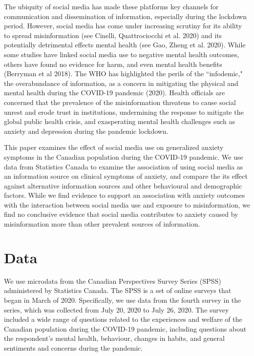 \documentclass{article}[12pt]
\begin{document}
        The ubiquity of social media has made these platforms key channels for communication and dissemination of information, especially during the lockdown period. However, social media has come under increasing scrutiny for its ability to spread misinformation (see Cinelli, Quattrociocchi et al. 2020) and its potentially detrimental effects mental health (see Gao, Zheng et al. 2020). While some studies have linked social media use to negative mental health outcomes, others have found no evidence for harm, and even mental health benefits (Berryman et al 2018). The WHO has highlighted the perils of the ``infodemic," the overabundance of information, as a concern in mitigating the physical and mental health during the COVID-19 pandemic (2020). Health officials are concerned that the prevalence of the misinformation threatens to cause social unrest and erode trust in institutions, undermining the response to mitigate the global public health crisis, and exasperating mental health challenges such as anxiety and depression during the pandemic lockdown.
        
        This paper examines the effect of social media use on generalized anxiety symptoms in the Canadian population during the COVID-19 pandemic. We use data from Statistics Canada to examine the association of using social media as an information source on clinical symptoms of anxiety, and compare the its effect against alternative information sources and other behavioural and demographic factors. While we find evidence to support an association with anxiety outcomes with the interaction between social media use and exposure to misinformation, we find no conclusive evidence that social media contributes to anxiety caused by misinformation more than other prevalent sources of information.
        
    \section{Data}
        
        We use microdata from the Canadian Perspectives Survey Series (SPSS) administered by Statistics Canada. The SPSS is a set of online surveys that began in March of 2020. Specifically, we use data from the fourth survey in the series, which was collected from July 20, 2020 to July 26, 2020. The survey included a wide range of questions related to the experiences and welfare of the Canadian population during the COVID-19 pandemic, including questions about the respondent's mental health, behaviour, changes in habits, and general sentiments and concerns during the pandemic.
        
\end{document}

